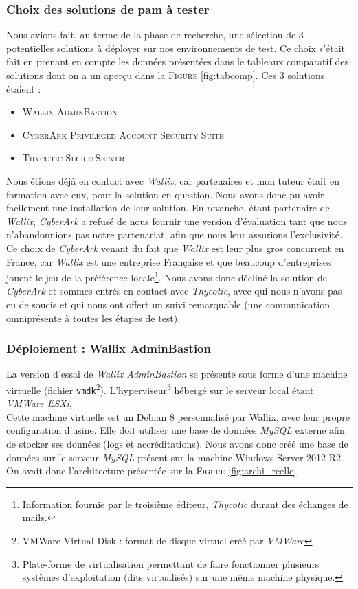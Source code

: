 \subsubsection{Choix des solutions de \gls{pam} à tester}
\label{par:choixsol}

Nous avions fait, au terme de la phase de recherche, une sélection de 3 potentielles solutions à déployer sur nos environnements de test. Ce choix s'était fait en prenant en compte les données présentées dans le tableaux comparatif des solutions dont on a un aperçu dans la \textsc{Figure} \ref{fig:tabcomp}. Ces 3 solutions étaient :
\begin{itemize}
	\item \textsc{Wallix AdminBastion}
	\item \textsc{CyberArk Privileged Account Security Suite}
	\item \textsc{Thycotic SecretServer}
\end{itemize}

Nous étions déjà en contact avec \emph{Wallix}, car partenaires et mon tuteur était en formation avec eux, pour la solution en question. Nous avons donc pu avoir facilement une installation de leur solution. En revanche, étant partenaire de \emph{Wallix}, \emph{CyberArk} a refusé de nous fournir une version d'évaluation tant que nous n'abandonnions pas notre partenariat, afin que nous leur assurions l'exclusivité. Ce choix de \emph{CyberArk} venant du fait que \emph{Wallix} est leur plus gros concurrent en France, car \emph{Wallix} est une entreprise Française et que beaucoup d'entreprises jouent le jeu de la préférence locale\footnote{Information fournie par le troisième éditeur, \emph{Thycotic} durant des échanges de mails.}. Nous avons donc décliné la solution de \emph{CyberArk} et sommes entrés en contact avec \emph{Thycotic}, avec qui nous n'avons pas eu de soucis et qui nous ont offert un suivi remarquable (une communication omniprésente à toutes les étapes de test).

\subsubsection{Déploiement : Wallix AdminBastion}
\label{par:depwallix}

La version d'essai de \emph{Wallix AdminBastion} se présente sous forme d'une machine virtuelle (fichier \texttt{vmdk}\footnote{VMWare Virtual Disk : format de disque virtuel créé par \emph{VMWare}}). L'hyperviseur\footnote{Plate-forme de virtualisation permettant de faire fonctionner plusieurs systèmes d'exploitation (dits virtualisés) sur une même machine physique.} hébergé sur le serveur local étant \emph{VMWare ESXi}, \\
Cette machine virtuelle est un Debian 8 personnalisé par Wallix, avec leur propre configuration d'usine. Elle doit utiliser une base de données \emph{MySQL} externe afin de stocker ses données (logs et accréditations). Nous avons donc créé une base de données sur le serveur \emph{MySQL} présent sur la machine Windows Server 2012 R2. On avait donc l'architecture présentée sur la \textsc{Figure} \ref{fig:archi_reelle}

